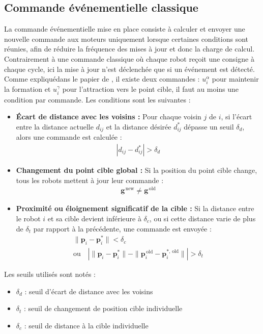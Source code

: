 \subsection{Commande événementielle classique}

La commande événementielle mise en place consiste à calculer et envoyer une nouvelle commande aux moteurs uniquement lorsque certaines conditions sont réunies, afin de réduire la fréquence des mises à jour et donc la charge de calcul. Contrairement à une commande classique où chaque robot reçoit une consigne à chaque cycle, ici la mise à jour n'est déclenchée que si un événement est détecté. Comme expliquédans le papier de \cite{koung_consensus-based_2020}, il existe deux commandes : $u_i^\alpha$ pour maintenir la formation et $u_i^\gamma$ pour l'attraction vers le point cible, il faut au moins une condition par commande.
Les conditions sont les suivantes :
\begin{itemize}
    \item \textbf{Écart de distance avec les voisins :} Pour chaque voisin $j$ de $i$, si l'écart entre la distance actuelle $d_{ij}$ et la distance désirée $d_{ij}^*$ dépasse un seuil $\delta_d$, alors une commande est calculée :
    \begin{align*}
        |d_{ij} - d_{ij}^*| > \delta_d
    \end{align*}
    \item \textbf{Changement du point cible global :} Si la position du point cible change, tous les robots mettent à jour leur commande :
    \begin{align*}
        \mathbf{g}^{\,\text{new}} \neq \mathbf{g}^{\,\text{old}}
    \end{align*}
    \item \textbf{Proximité ou éloignement significatif de la cible :} Si la distance entre le robot $i$ et sa cible devient inférieure à $\delta_c$, ou si cette distance varie de plus de $\delta_t$ par rapport à la précédente, une commande est envoyée :
    \begin{align*}
        \|\mathbf{p}_i - \mathbf{p}_i^*\| < \delta_c \\
        \text{ou} \quad |\|\mathbf{p}_i - \mathbf{p}_i^*\| - \|\mathbf{p}_i^{\,\text{old}} - \mathbf{p}_i^{*,\,\text{old}}\|| > \delta_t
    \end{align*}
\end{itemize}

Les seuils utilisés sont notés :
\begin{itemize}
    \item $\delta_d$ : seuil d'écart de distance avec les voisins
    \item $\delta_t$ : seuil de changement de position cible individuelle
    \item $\delta_c$ : seuil de distance à la cible individuelle
\end{itemize}

